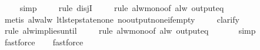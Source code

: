 \begin{isabellebody}
\ \ \ \isamarkupfalse%
\ simp\isanewline
\ \ \ \isamarkupfalse%
\ {\isacharparenleft}rule\ disjI{}{\isacharparenright}\isanewline
\ \ \ \isamarkupfalse%
\ {\isacharparenleft}rule\ alw{\isacharunderscore}mono{\isacharbrackleft}of\ {\isachardoublequoteopen}alw\ {\isacharparenleft}output{\isacharunderscore}eq\ {\isacharbrackleft}{\isacharbrackright}{\isacharparenright}{\isachardoublequoteclose}{\isacharbrackright}{\isacharparenright}\isanewline
\ \ \ \ \isamarkupfalse%
\ {\isacharparenleft}metis\ alw{\isacharunderscore}alw\ ltl{\isacharunderscore}step{\isacharunderscore}state{\isacharunderscore}none\ no{\isacharunderscore}output{\isacharunderscore}none{\isacharunderscore}if{\isacharunderscore}empty{\isacharparenright}\isanewline
\ \ \ \isamarkupfalse%
\ clarify\isanewline
\ \ \ \isamarkupfalse%
\ {\isacharparenleft}rule\ alw{\isacharunderscore}implies{\isacharunderscore}until{\isacharparenright}\isanewline
\ \ \ \isamarkupfalse%
\ {\isacharparenleft}rule\ alw{\isacharunderscore}mono{\isacharbrackleft}of\ {\isachardoublequoteopen}alw\ {\isacharparenleft}output{\isacharunderscore}eq\ {\isacharbrackleft}{\isacharbrackright}{\isacharparenright}{\isachardoublequoteclose}{\isacharbrackright}{\isacharparenright}\isanewline
\ \ \ \ \isamarkupfalse%
\ simp\isanewline
\ \ \ \isamarkupfalse%
\ fastforce\isanewline
\ \ \isamarkupfalse%
\ fastforce%
\endisatagproof
{\isafoldproof}%
%
\isadelimproof
%
\endisadelimproof
%
\end{isabellebody}
